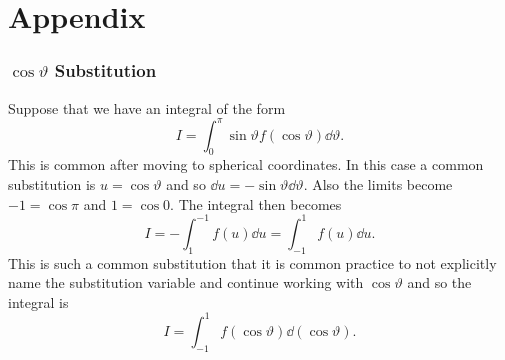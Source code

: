 \documentclass[a4paper]{article}
\begin{document}
    \clearpage
    \appendix
    \part*{Appendix}
    \begingroup
    
    
    
    
    \endgroup
    \section{\texorpdfstring{\(\cos\vartheta\)}{cos theta} Substitution}\label{app:cos theta substitution}
    Suppose that we have an integral of the form
    \[I = \int_{0}^{\pi} \sin\vartheta f(\cos\vartheta) \dd{\vartheta}.\]
    This is common after moving to spherical coordinates.
    In this case a common substitution is \(u = \cos\vartheta\) and so \(\dd{u} = -\sin\vartheta\dd{\vartheta}\).
    Also the limits become \(-1 = \cos\pi\) and \(1 = \cos 0\).
    The integral then becomes
    \[I = -\int_{1}^{-1} f(u) \dd{u} = \int_{-1}^{1} f(u)\dd{u}.\]
    This is such a common substitution that it is common practice to not explicitly name the substitution variable and continue working with \(\cos\vartheta\) and so the integral is
    \[I = \int_{-1}^{1} f(\cos\vartheta) \dd{(\cos\vartheta)}.\]
\end{document}
